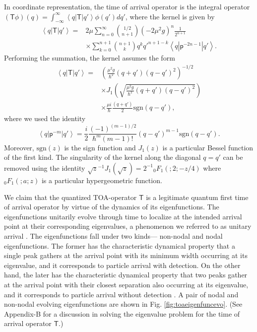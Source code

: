 \documentclass[%
 reprint,
 amsmath,amssymb,
 aps,
]{revtex4-1}
\newcommand{\opr}[1]{\ensuremath{\mathbf{\mathsf{#1}}}}
\newcommand{\kernel}[1]{\ensuremath{\left<q\left|#1\right|q'\right>}}
\begin{document}
In coordinate representation, the time of arrival operator is the integral operator $(\opr{T}\phi)(q)=\int_{-\infty}^{\infty} \kernel{\opr{T}}\phi(q') dq'$, where the kernel is given by
\begin{align}
\kernel{\opr{T}}=& 2 \mu \sum_{n=0}^{\infty} \binom{1/2}{n+1} (-2 \mu^2 g)^n  \frac{1}{2^{n+1}} \nonumber \\
& \times \sum_{k=0}^{n+1} \binom{n+1}{k} q^k q'^{n+1-k} \kernel{\opr{p}^{-2n-1}}. 
\end{align}
Performing the summation, the kernel assumes the form 
\begin{align}
\kernel{\opr{T}}= &\left(\frac{\mu^2 g}{\hbar^2}(q+q')(q-q')^2\right)^{-1/2} \nonumber \\
& \times J_1\left(\sqrt{\frac{\mu^2 g}{\hbar^2}(q+q')(q-q')^2}\right) \nonumber \\
&\times \frac{\mu i}{\hbar} \frac{(q+q')}{2}\mbox{sgn}(q-q'),
\label{kernel}  
\end{align}
where we used the identity \cite{jaykel,table}
\begin{equation*}
\kernel{\opr{p}^{-m}} = \frac{i}{2} \dfrac{(-1)^{(m-1)/2}}{\hbar^m (m-1)!} (q-q')^{m-1} \mbox{sgn}(q-q').
\end{equation*}
Moreover, $\mbox{sgn}(z)$ is the sign function and $J_1(z)$ is a particular Bessel function of the first kind. The singularity of the kernel along the diagonal $q=q'$ can be removed using the identity $\sqrt{z}^{-1}J_{1}(\sqrt{z})=2^{-1}{_0 F_1}(;2;-z/4)$ where ${_0 F_1}(;a;z)$ is a particular hypergeometric function.

We claim that the quantized TOA-operator $\opr{T}$ is a legitimate quantum first time of arrival operator by virtue of the dynamics of its eigenfunctions. The eigenfunctions unitarily evolve through time to localize at the intended arrival point  at their corresponding eigenvalues, a phenomenon we referred to as unitary arrival \cite{GCB2004PRL_a,GCB2004PRL_b,denny,denny2,jaykel}. %
The eigenfunctions fall under two kinds--- non-nodal and nodal eigenfunctions. The former has the characteristic dynamical property that a single peak gathers at the arrival point with its minimum width occurring at its eigenvalue, and it corresponds to particle arrival with detection. On the other hand, the later has the characteristic dynamical property that two peaks gather at the arrival point with their closest separation also occurring at its eigenvalue, and it corresponds to particle arrival without detection \cite{jaykel,denny,denny2}. A pair of nodal and non-nodal evolving eigenfunctions are shown in Fig. \ref{fig:toaeigenfuncevo}. (See Appendix-B for a discussion in solving the eigenvalue problem for the time of arrival operator $\opr{T}$.)
\end{document}
